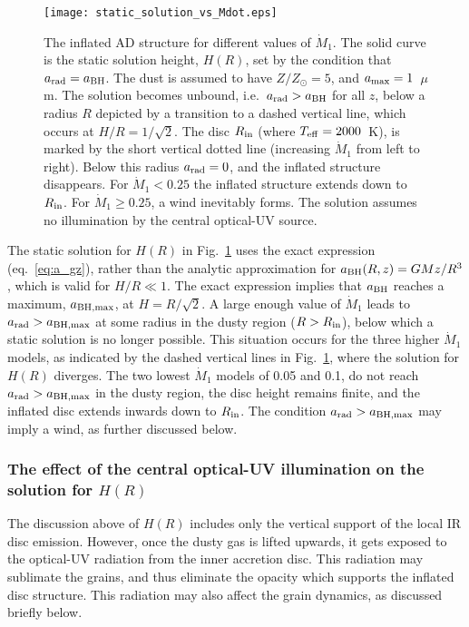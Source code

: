 \documentclass[a4paper,fleqn,usenatbib]{mnras}
\newcommand{\mdot}{\dot{M}}
\newcommand{\amax}{\mbox{$a_{\rm max}$}}
\newcommand{\mic}{\mbox{$\mu$m}}
\begin{document}
\begin{figure}
\vspace*{0.6cm}
\texttt{[image: static\_solution\_vs\_Mdot.eps]}
\caption{The inflated AD structure for different values of $\mdot_1$. 
The solid curve is the static solution height, $H(R)$, set by the condition that $a_{\rm rad}=a_{\rm BH}$.
The dust is assumed to have $Z/Z_{\odot}=5$, and $\amax=1$~\mic. The solution becomes unbound, 
i.e.\ $a_{\rm rad}>a_{\rm BH}$ for all $z$, below a radius $R$ depicted by a transition to a dashed vertical line,
which occurs at $H/R=1/\sqrt{2}$. The disc $R_{\rm in}$ (where $T_{\rm eff}=2000$~K), 
is marked by the short vertical dotted line (increasing $\mdot_1$ from left to right). Below 
this radius $a_{\rm rad}=0$, and the inflated structure disappears. For $\mdot_1<0.25$ the inflated structure
extends down to $R_{\rm in}$. For $\mdot_1\ge 0.25$, a wind inevitably forms. 
The solution assumes no illumination by the central optical-UV source.}
\label{fig:static_solution_vs_Mdot}
\end{figure} 



The static solution for $H(R)$ in Fig.~\ref{fig:static_solution_vs_Mdot} uses the exact expression (eq.~\ref{eq:a_gz}), rather than the analytic approximation for $a_{\rm BH}(R,z)=GMz/R^3$, 
which is valid for $H/R\ll 1$.
The exact expression implies that $a_{\rm BH}$ reaches a maximum, $a_{\rm BH, max}$, at 
$H=R/\sqrt{2}$. A large 
enough value of $\mdot_1$ leads to $a_{\rm rad}>a_{\rm BH, max}$ at some radius in the dusty region
($R>R_{\rm in}$), below which
a static solution is no longer possible. This situation occurs for the three 
higher $\mdot_1$ models, as indicated by the dashed vertical lines in Fig.~\ref{fig:static_solution_vs_Mdot},
where the solution for $H(R)$ diverges. The two lowest $\mdot_1$ models of 0.05 and 
0.1, do not reach $a_{\rm rad}>a_{\rm BH, max}$ in the dusty region, the disc height remains finite,
and the inflated disc extends inwards down to $R_{\rm in}$. The condition $a_{\rm rad}>a_{\rm BH, max}$
may imply a wind, as further discussed below.






\subsubsection{The effect of the central optical-UV illumination on the solution for $H(R)$}

The discussion above of $H(R)$ includes only the vertical support of the local IR disc emission. 
However, once the dusty gas is lifted upwards, it gets exposed to 
the optical-UV radiation from the inner accretion disc. This radiation may sublimate the grains, and thus eliminate the opacity which supports the inflated disc structure. This radiation may also affect the grain dynamics, as discussed briefly below.
\end{document}
